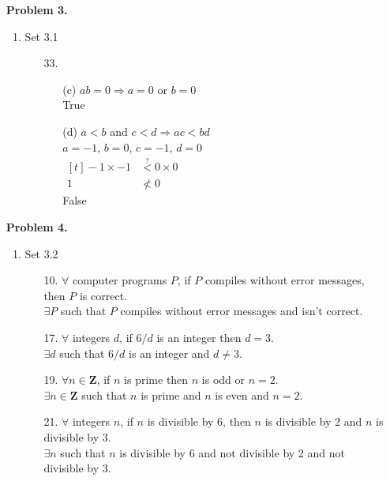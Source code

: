 \documentclass[letterpaper,fleqn]{article}
\begin{document}
\begin{enumerate}
		\item [] \textbf{Problem 3.}
		\begin{enumerate}[]
			\item Set 3.1
			\begin{enumerate}
				\item [33.] \quad
				\begin{enumerate}
					\item [(c)]
					$ab = 0 \Rightarrow a = 0$ or $b=0$ \\
					True
					
					\item [(d)]
					$a < b$ and $c < d \Rightarrow ac < bd$ \\
					$a=-1$, $b=0$, $c=-1$, $d=0$ \\
					$\begin{aligned}[t]
						-1 \times -1 & \stackrel{?}{<} 0 \times 0 \\
						1 & \not < 0
					\end{aligned}$ \\
					False
				\end{enumerate}
			\end{enumerate}
		\end{enumerate}
		
		\item [] \textbf{Problem 4.}
		\begin{enumerate}[]
			\item Set 3.2
			\begin{enumerate}
				\item [10.]
				$\forall$ computer programs $P$, if $P$ compiles without error messages, then $P$ is correct. \\
				$\exists P$ such that $P$ compiles without error messages and isn't correct.
				
				\item [17.]
				$\forall$ integers $d$, if $6/d$ is an integer then $d=3$. \\
				$\exists d$ such that $6/d$ is an integer and $d \not= 3$.
				
				\item [19.]
				$\forall n \in \mathbf{Z}$, if $n$ is prime then $n$ is odd or $n=2$. \\
				$\exists n \in \mathbf{Z}$ such that $n$ is prime and $n$ is even and $n=2$.
				
				\item [21.]
				$\forall$ integers $n$, if $n$ is divisible by 6, then $n$ is divisible by 2 and $n$ is divisible by 3. \\
				$\exists n$ such that $n$ is divisible by 6 and not divisible by 2 and not divisible by 3. 
				

\end{enumerate}
\end{enumerate}
\end{enumerate}
\end{document}
